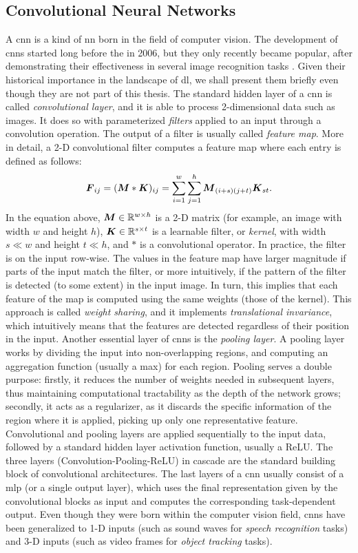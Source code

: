 \subsection{Convolutional Neural Networks}
A \gls{cnn} \citep{lecun1995convolutionalnn} is a kind of \gls{nn} born in the field of computer vision. The development of \glspl{cnn} started long before the  in 2006, but they only recently became popular, after demonstrating their effectiveness in several image recognition tasks \citep{krizhevsky2017imagenet}. Given their historical importance in the landscape of \gls{dl}, we shall present them briefly even though they are not part of this thesis. The standard hidden layer of a \gls{cnn} is called \emph{convolutional layer}, and it is able to process 2-dimensional data such as images. It does so with parameterized \emph{filters} applied to an input through a convolution operation. The output of a filter is usually called \emph{feature map}. More in detail, a 2-D convolutional filter computes a feature map where each entry is defined as follows:
$$\Matrix{F}_{ij} = (\Matrix{M} * \Matrix{K})_{ij} = \sum_{i=1}^{w} \sum_{j=1}^{h} \Matrix{M}_{(i+s)(j+t)}\Matrix{K}_{st}.$$
In the equation above, $\Matrix{M} \in \Real^{w \times h}$ is a 2-D matrix (for example, an image with width $w$ and height $h$), $\Matrix{K} \in \Real^{s \times t}$ is a learnable filter, or \emph{kernel}, with width $s \ll w$ and height $t \ll h$, and $*$ is a convolutional operator. In practice, the filter is  on the input row-wise. The values in the feature map have larger magnitude if parts of the input match the filter, or more intuitively, if the pattern of the filter is detected (to some extent) in the input image. In turn, this implies that each feature of the map is computed using the same weights (those of the kernel). This approach is called \emph{weight sharing}, and it implements \emph{translational invariance}, which intuitively means that the features are detected regardless of their position in the input. Another essential layer of \glspl{cnn} is the \emph{pooling layer}. A pooling layer works by dividing the input into non-overlapping regions, and computing an aggregation function (usually a max) for each region. Pooling serves a double purpose: firstly, it reduces the number of weights needed in subsequent layers, thus maintaining computational tractability as the depth of the network grows; secondly, it acts as a regularizer, as it discards the specific information of the region where it is applied, picking up only one representative feature. Convolutional and pooling layers are applied sequentially to the input data, followed by a standard hidden layer activation function, usually a ReLU. The three layers (Convolution-Pooling-ReLU) in cascade are the standard building block of convolutional architectures. The last layers of a \gls{cnn} usually consist of a \gls{mlp} (or a single output layer), which uses the final representation given by the convolutional blocks as input and computes the corresponding task-dependent output. Even though they were born within the computer vision field, \glspl{cnn} have been generalized to 1-D inputs (such as sound waves for \emph{speech recognition} tasks) and 3-D inputs (such as video frames for \emph{object tracking} tasks).


